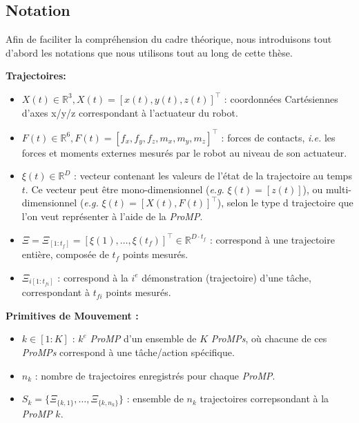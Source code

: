 \documentclass[utf8]{frontiersSCNS} %
\begin{document}

\subsection{Notation}\label{sec:notation}

Afin de faciliter la compréhension du cadre théorique, nous introduisons tout d'abord les notations que nous utilisons tout au long de cette thèse.

\noindent
\textbf{Trajectoires:}
\begin{itemize}
\item $X(t)\in \mathbb{R}^3, X(t) = [x(t), y(t), z(t)]^\top$ : coordonnées Cartésiennes d'axes x/y/z correspondant à l'actuateur du robot.
\item $F(t) \in \mathbb{R}^6, F(t) = [f_x, f_y, f_z, m_x, m_y, m_z]^\top$ : forces de contacts, \textit{i.e.} les forces et moments externes mesurés par le robot au niveau de son actuateur.
\item $\xi(t) \in \mathbb{R}^D$ : vecteur contenant les valeurs de l'état de la trajectoire au temps $t$. Ce vecteur peut être mono-dimensionnel (\textit{e.g.} $\xi(t) = [z(t)]$), ou multi-dimensionnel (\textit{e.g.} $\xi(t) = [X(t), F(t)]^\top$), selon le type d trajectoire que l'on veut représenter à l'aide de la \textit{ProMP}.

\item $\Xi = \Xi_{[1:t_{f}]} = [\xi(1), \ldots, \xi(t_{f})]^\top \in \mathbb{R}^{D \cdot t_{f}}$ : correspond à une trajectoire entière, composée de $t_f$ points mesurés.

\item $\Xi_{i[1:t_{fi}]}$ : correspond à la $i^{e}$ démonstration (trajectoire) d'une tâche, correspondant à $t_{fi}$ points mesurés.


\end{itemize}
\textbf{Primitives de Mouvement :}
\begin{itemize}
\item $k \in [1:K]$ : $k^{e}$ \textit{ProMP} d'un ensemble de $K$ \textit{ProMPs}, où chacune de ces \textit{ProMPs} correspond à une tâche/action spécifique.
\item $n_k$ : nombre de trajectoires enregistrés pour chaque \textit{ProMP}.
\item $S_k = \{\Xi_{\{k,1\}},\ldots,\Xi_{\{k,n_k\}}\}$ : ensemble de $n_k$ trajectoires correpsondant à la \textit{ProMP} $k$. 
\end{itemize}
\end{document}
